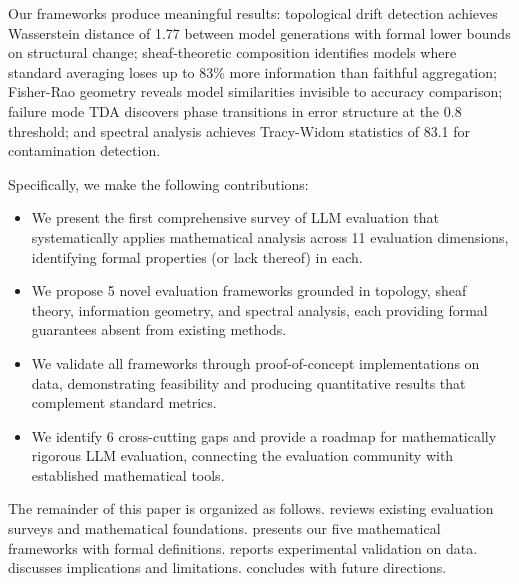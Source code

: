 Our frameworks produce meaningful results: topological drift detection achieves Wasserstein distance of 1.77 between model generations with formal lower bounds on structural change; sheaf-theoretic composition identifies models where standard averaging loses up to 83\% more information than faithful aggregation; Fisher-Rao geometry reveals model similarities invisible to accuracy comparison; failure mode TDA discovers phase transitions in error structure at the 0.8 threshold; and spectral analysis achieves Tracy-Widom statistics of 83.1 for contamination detection.

Specifically, we make the following contributions:
\begin{itemize}[leftmargin=*,itemsep=0pt,topsep=0pt]
    \item We present the first comprehensive survey of LLM evaluation that systematically applies mathematical analysis across 11 evaluation dimensions, identifying formal properties (or lack thereof) in each.
    \item We propose 5 novel evaluation frameworks grounded in topology, sheaf theory, information geometry, and spectral analysis, each providing formal guarantees absent from existing methods.
    \item We validate all frameworks through proof-of-concept implementations on \mmlu data, demonstrating feasibility and producing quantitative results that complement standard metrics.
    \item We identify 6 cross-cutting gaps and provide a roadmap for mathematically rigorous LLM evaluation, connecting the evaluation community with established mathematical tools.
\end{itemize}

The remainder of this paper is organized as follows.
 reviews existing evaluation surveys and mathematical foundations.
 presents our five mathematical frameworks with formal definitions.
 reports experimental validation on \mmlu data.
 discusses implications and limitations.
 concludes with future directions.
